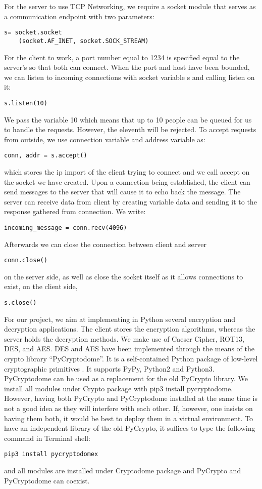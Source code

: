 For the server to use TCP Networking, we require a socket module that serves as a communication endpoint with two parameters:
\begin{verbatim}
s= socket.socket
    (socket.AF_INET, socket.SOCK_STREAM)
\end{verbatim}
For the client to work, a port number equal to 1234 is specified equal to the server’s so that both can connect. When the port and host have been bounded, we can listen to incoming connections with socket variable s and calling listen on it:
\begin{verbatim}
s.listen(10)
\end{verbatim}
We pass the variable 10 which means that up to 10 people can be queued for us to handle the requests. However, the eleventh will be rejected. To accept requests from outside, we use connection variable and address variable as:
\begin{verbatim}
conn, addr = s.accept()
\end{verbatim} 
which stores the ip import of the client trying to connect and we call accept on the socket we have created. Upon a connection being established, the client can send messages to the server that will cause it to echo back the message. The server can receive data from client by creating variable data and sending it to the response gathered from connection. We write:
\begin{verbatim}
incoming_message = conn.recv(4096)
\end{verbatim} 
Afterwards we can close the connection between client and server
\begin{verbatim} 
conn.close()
\end{verbatim} 
on the server side, as well as close the socket itself as it allows connections to exist, on the client side,
\begin{verbatim} 
s.close()
\end{verbatim}
For our project, we aim at implementing in Python several encryption and decryption applications. The client stores the encryption algorithms, whereas the server holds the decryption methods. We make use of Caeser Cipher, ROT13, DES, and AES.
DES and AES have been implemented through the means of the crypto library “PyCryptodome”. It is a self-contained Python package of low-level cryptographic primitives \cite{pycryptodome}. It supports PyPy, Python2 and Python3. PyCryptodome can be used as a replacement for the old PyCrypto library. We install all modules under Crypto package with pip3 install pycryptodome.  However, having both PyCrypto and PyCryptodome installed at the same time is not a good idea as they will interfere with each other. If, however, one insists on having them both, it would be best to deploy them in a virtual environment. To have an independent library of the old PyCrypto, it suffices to type the following command in Terminal shell:
\begin{verbatim}
pip3 install pycryptodomex
\end{verbatim} 
and all modules are installed under Cryptodome package and PyCrypto and PyCryptodome can coexist. 


